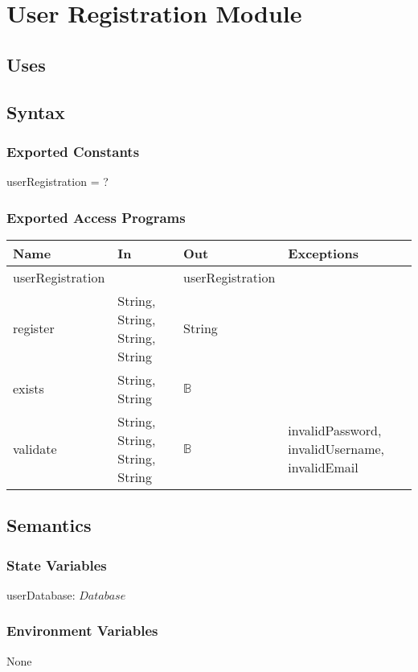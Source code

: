 \documentclass[12pt, titlepage]{article}
\begin{document}
\section{User Registration Module}

\subsection{Uses}

\subsection{Syntax}

\subsubsection{Exported Constants}
userRegistration = ?
\subsubsection{Exported Access Programs}

\begin{center}
	\begin{tabular}{p{4cm} p{4cm} p{4cm} p{4cm}}
		\hline
		\textbf{Name} & \textbf{In} & \textbf{Out} & \textbf{Exceptions} \\
		\hline
		userRegistration &  & userRegistration &  \\
		register & String, String, String, String & String &  \\
		exists & String, String & $\mathbb{B}$ & \\
		validate & String, String, String, String & $\mathbb{B}$ & invalidPassword, invalidUsername, invalidEmail\\
		\hline
	\end{tabular}
\end{center}

\subsection{Semantics}

\subsubsection{State Variables}
userDatabase: $Database$

\subsubsection{Environment Variables}
None
\end{document}
